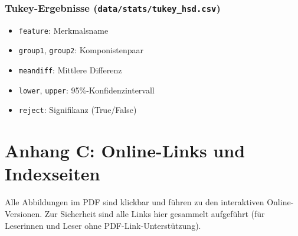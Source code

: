 \documentclass[12pt,a4paper]{article}
\theoremstyle{definition}
\begin{document}
\subsubsection{Tukey-Ergebnisse (\texttt{data/stats/tukey\_hsd.csv})}
\begin{itemize}
    \item \texttt{feature}: Merkmalsname
    \item \texttt{group1}, \texttt{group2}: Komponistenpaar
    \item \texttt{meandiff}: Mittlere Differenz
    \item \texttt{lower}, \texttt{upper}: 95\%-Konfidenzintervall
    \item \texttt{reject}: Signifikanz (True/False)
\end{itemize}

\section{Anhang C: Online-Links und Indexseiten}

\newcommand{\linkurl}[1]{\href{#1}{\textcolor{blue}{\underline{\small\nolinkurl{#1}}}}}

Alle Abbildungen im PDF sind klickbar und führen zu den interaktiven Online-Versionen. Zur Sicherheit sind alle Links hier gesammelt aufgeführt (für Leserinnen und Leser ohne PDF-Link-Unterstützung).
\end{document}
